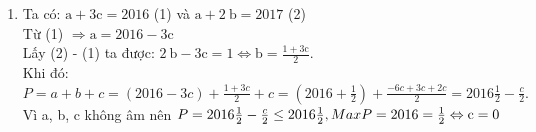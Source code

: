 \begin{bt}
{\begin{enumerate}
			\item Ta có: $\mathrm{a}+3 \mathrm{c}=2016$ (1) và $\mathrm{a}+2 \mathrm{~b}=2017$ (2)\\
			Từ (1) $\Rightarrow \mathrm{a}=2016-3 \mathrm{c}$\\
			Lấy (2) - (1) ta được: $2 \mathrm{~b}-3 \mathrm{c}=1 \Leftrightarrow \mathrm{b}=\frac{1+3 \mathrm{c}}{2}$.\\
			Khi đó:\\
			$
P=a+b+c=(2016-3 c)+\frac{1+3 c}{2}+c=\left(2016+\frac{1}{2}\right)+\frac{-6 c+3 c+2 c}{2}=2016 \frac{1}{2}-\frac{c}{2} .
$\\
Vì a, b, c không âm nên $P=2016 \frac{1}{2}-\frac{c}{2} \leq 2016 \frac{1}{2}, MaxP=2016 = \frac{1}{2}\\ \Leftrightarrow \mathrm{c}=0$
		\end{enumerate}
	}
\end{bt}